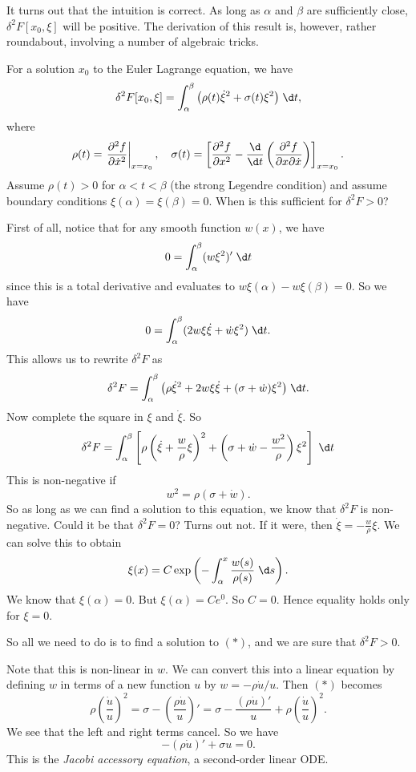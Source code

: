\documentclass[a4paper]{article}
\begin{document}
It turns out that the intuition is correct. As long as $\alpha$ and $\beta$ are sufficiently close, $\delta^2 F[x_0, \xi]$ will be positive. The derivation of this result is, however, rather roundabout, involving a number of algebraic tricks.

For a solution $x_0$ to the Euler Lagrange equation, we have
\[
  \delta^2 F[x_0, \xi] = \int_\alpha^\beta \big(\rho(t) \dot{\xi}^2 + \sigma(t) \xi^2\big)\;\d t,
\]
where
\[
  \rho(t) = \left.\frac{\partial^2 f}{\partial \dot{x}^2}\right|_{x = x_0},\quad
  \sigma(t) = \left[\frac{\partial^2 f}{\partial x^2} - \frac{\d}{\d t}\left(\frac{\partial^2 f}{\partial x \partial \dot{x}}\right)\right]_{x = x_0}.
\]
Assume $\rho(t) > 0$ for $\alpha < t < \beta$ (the strong Legendre condition) and assume boundary conditions $\xi(\alpha) = \xi(\beta) = 0$. When is this sufficient for $\delta^2 F > 0$?

First of all, notice that for any smooth function $w(x)$, we have
\[
  0 = \int_\alpha^\beta (w\xi^2)' \;\d t
\]
since this is a total derivative and evaluates to $w\xi(\alpha) - w\xi(\beta) = 0$. So we have
\[
  0 = \int_\alpha^\beta (2w\xi \dot{\xi} + \dot{w}\xi^2)\;\d t.
\]
This allows us to rewrite $\delta^2 F$ as
\[
  \delta^2 F = \int_\alpha^\beta \big(\rho \dot{\xi}^2 + 2w\xi \dot{\xi} + (\sigma + \dot{w})\xi^2\big)\;\d t.
\]
Now complete the square in $\xi$ and $\dot{\xi}$. So
\[
  \delta^2 F = \int_\alpha^\beta \left[\rho\left(\dot{\xi} + \frac{w}{\rho} \xi\right)^2 +\left(\sigma + \dot{w} - \frac{w^2}{\rho}\right)\xi^2 \right]\;\d t
\]
This is non-negative if
\[
  w^2 = \rho(\sigma + \dot{w}).\tag{$*$}
\]
So as long as we can find a solution to this equation, we know that $\delta^2 F$ is non-negative. Could it be that $\delta^2 F = 0$? Turns out not. If it were, then $\dot{\xi} = -\frac{w}{\rho}\xi$. We can solve this to obtain
\[
  \xi(x) = C\exp\left(-\int_\alpha^x \frac{w(s)}{\rho(s)}\;\d s\right).
\]
We know that $\xi(\alpha) = 0$. But $\xi(\alpha) = C e^0$. So $C = 0$. Hence equality holds only for $\xi = 0$.

So all we need to do is to find a solution to $(*)$, and we are sure that $\delta^2 F > 0$.

Note that this is non-linear in $w$. We can convert this into a linear equation by defining $w$ in terms of a new function $u$ by $w = -\rho \dot{u}/u$. Then $(*)$ becomes
\[
  \rho\left(\frac{\dot{u}}{u}\right)^2 = \sigma - \left(\frac{\rho \dot{u}}{u}\right)' = \sigma - \frac{(\rho \dot{u})'}{u} + \rho \left(\frac{\dot{u}}{u}\right)^2.
\]
We see that the left and right terms cancel. So we have
\[
  -(\rho \dot{u})' + \sigma u = 0.
\]
This is the \emph{Jacobi accessory equation}, a second-order linear ODE.
\end{document}
